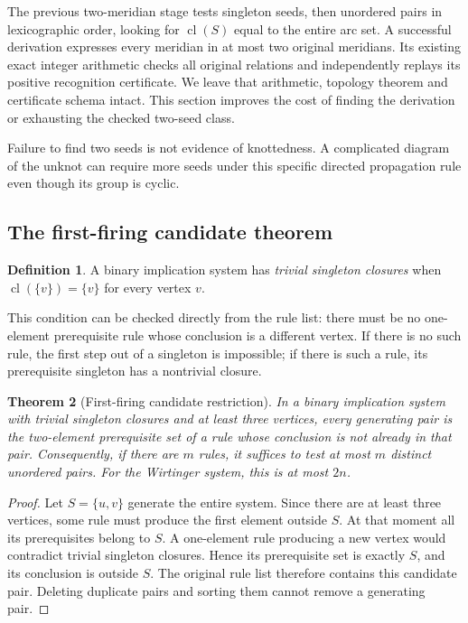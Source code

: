 \documentclass[11pt,a4paper]{article}
\newtheorem{theorem}{Theorem}[section]
\theoremstyle{definition}\newtheorem{definition}[theorem]{Definition}
\theoremstyle{remark}\newtheorem{remark}[theorem]{Remark}
\newcommand{\cl}{\operatorname{cl}}
\begin{document}
The previous two-meridian stage tests singleton seeds, then unordered
pairs in lexicographic order, looking for $\cl(S)$ equal to the entire
arc set. A successful derivation expresses every meridian in at most two
original meridians. Its existing exact integer arithmetic checks all
original relations and independently replays its positive recognition
certificate. We leave that arithmetic, topology theorem and certificate
schema intact. This section improves the cost of finding the derivation
or exhausting the checked two-seed class.

Failure to find two seeds is not evidence of knottedness. A complicated
diagram of the unknot can require more seeds under this specific directed
propagation rule even though its group is cyclic.

\subsection{The first-firing candidate theorem}

\begin{definition}
A binary implication system has \emph{trivial singleton closures} when
$\cl(\{v\})=\{v\}$ for every vertex $v$.
\end{definition}

This condition can be checked directly from the rule list: there must be
no one-element prerequisite rule whose conclusion is a different vertex.
If there is no such rule, the first step out of a singleton is impossible;
if there is such a rule, its prerequisite singleton has a nontrivial closure.

\begin{theorem}[First-firing candidate restriction]\label{thm:seed}
In a binary implication system with trivial singleton closures and at
least three vertices, every generating pair is the two-element
prerequisite set of a rule whose conclusion is not already in that pair.
Consequently, if there are $m$ rules, it suffices to test at most $m$
distinct unordered pairs. For the Wirtinger system, this is at most $2n$.
\end{theorem}
\begin{proof}
Let $S=\{u,v\}$ generate the entire system. Since there are at least
three vertices, some rule must produce the first element outside $S$.
At that moment all its prerequisites belong to $S$. A one-element rule
producing a new vertex would contradict trivial singleton closures.
Hence its prerequisite set is exactly $S$, and its conclusion is outside
$S$. The original rule list therefore contains this candidate pair.
Deleting duplicate pairs and sorting them cannot remove a generating pair.
\end{proof}
\end{document}
